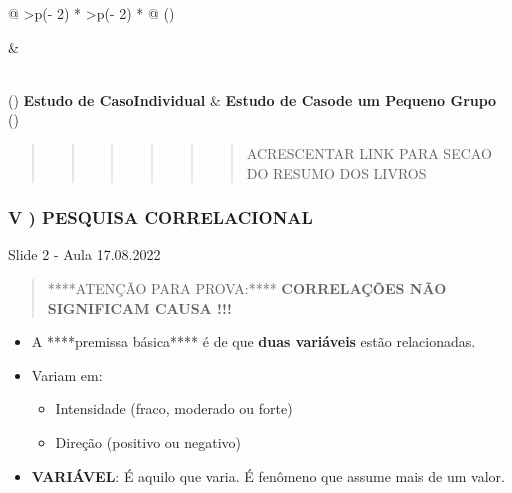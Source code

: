\documentclass[
]{book}
\providecommand{\tightlist}{%
  \setlength{\itemsep}{0pt}\setlength{\parskip}{0pt}}
\begin{document}
\begin{longtable}[]{@{}
  >{\centering\arraybackslash}p{(\columnwidth - 2\tabcolsep) * }
  >{\centering\arraybackslash}p{(\columnwidth - 2\tabcolsep) * }@{}}
\toprule()
\begin{minipage}[b]{\linewidth}\centering
\end{minipage} & \begin{minipage}[b]{\linewidth}\centering
\end{minipage} \\
\midrule()
\endhead
\textbf{Estudo de CasoIndividual} & \textbf{Estudo de Casode um Pequeno Grupo} \\
\bottomrule()
\end{longtable}

\begin{quote}
\begin{quote}
\begin{quote}
\begin{quote}
\begin{quote}
\begin{quote}
ACRESCENTAR LINK PARA SECAO DO RESUMO DOS LIVROS
\end{quote}
\end{quote}
\end{quote}
\end{quote}
\end{quote}
\end{quote}

\hypertarget{v-pesquisa-correlacional}{%
\subsubsection{V ) PESQUISA CORRELACIONAL}\label{v-pesquisa-correlacional}}

Slide 2 - Aula 17.08.2022

\begin{quote}
****ATENÇÃO PARA PROVA:**** \textbf{CORRELAÇÕES NÃO SIGNIFICAM CAUSA !!!}
\end{quote}

\begin{itemize}
\tightlist
\item
  A ****premissa básica**** é de que \textbf{duas variáveis} estão relacionadas.
\item
  Variam em:

  \begin{itemize}
  \tightlist
  \item
    Intensidade (fraco, moderado ou forte)
  \item
    Direção (positivo ou negativo)
  \end{itemize}
\item
  \textbf{VARIÁVEL}: É aquilo que varia. É fenômeno que assume mais de um valor.
\end{itemize}
\end{document}
